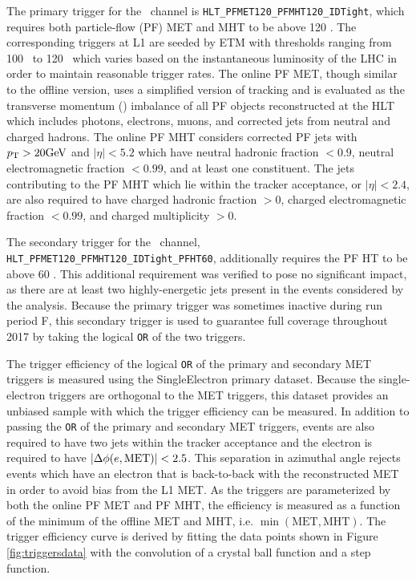 The primary trigger for the \ZnnH\ channel is \texttt{\small HLT\_PFMET120\_PFMHT120\_IDTight}, which requires both particle-flow (PF) MET and MHT to be above 120 \GeV. The corresponding triggers at L1 are seeded by ETM with thresholds ranging from 100 \GeV\ to 120 \GeV\, which varies based on the instantaneous luminosity of the LHC in order to maintain reasonable trigger rates. The online PF MET, though similar to the offline version, uses a simplified version of tracking and is evaluated as the transverse momentum (\pT) imbalance of all PF objects reconstructed at the HLT which includes photons, electrons, muons, and corrected jets from neutral and charged hadrons. The online PF MHT considers corrected PF jets with $p_{\mathrm{T}} > 20 \mathrm{GeV}$ and $\left|\eta\right| < 5.2$ which have neutral hadronic fraction $< 0.9$, neutral electromagnetic fraction $< 0.99$, and at least one constituent. The jets contributing to the PF MHT which lie within the tracker acceptance, or $\left|\eta\right| < 2.4$, are also required to have charged hadronic fraction $> 0$, charged electromagnetic fraction $< 0.99$, and charged multiplicity $> 0$.

The secondary trigger for the \ZnnH\ channel, \texttt{\small HLT\_PFMET120\_PFMHT120\_IDTight\_PFHT60}, additionally requires the PF HT to be above 60 \GeV. This additional requirement was verified to pose no significant impact, as there are at least two highly-energetic jets present in the events considered by the analysis. Because the primary trigger was sometimes inactive during run period F, this secondary trigger is used to guarantee full coverage throughout 2017 by taking the logical \texttt{OR} of the two triggers.

The trigger efficiency of the logical \texttt{OR} of the primary and secondary MET triggers is measured using the SingleElectron primary dataset. Because the single-electron triggers are orthogonal to the MET triggers, this dataset provides an unbiased sample with which the trigger efficiency can be measured. In addition to passing the \texttt{OR} of the primary and secondary MET triggers, events are also required to have two jets within the tracker acceptance and the electron is required to have $\left|\Delta\phi(e, \textrm{MET})\right| < 2.5$. This separation in azimuthal angle rejects events which have an electron that is back-to-back with the reconstructed MET in order to avoid bias from the L1 MET. As the triggers are parameterized by both the online PF MET and PF MHT, the efficiency is measured as a function of the minimum of the offline MET and MHT, i.e. $\min(\textrm{MET}, \textrm{MHT})$. The trigger efficiency curve is derived by fitting the data points shown in Figure \ref{fig:triggersdata} with the convolution of a crystal ball function and a step function.

